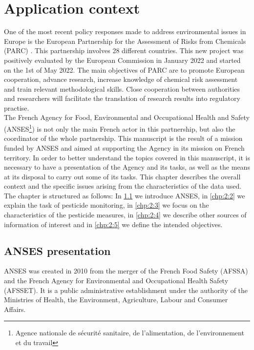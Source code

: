 \chapter{Application context}\label{chp:2}

\minitoc

\clearpage

One of the most recent policy responses made to address environmental issues in Europe is the European Partnership for the Assessment of Risks from Chemicals (PARC) \citep{PARC}. This partnership involves 28 different countries. This new project was positively evaluated by the European Commission in January 2022 and started on the 1st of May 2022. The main objectives of PARC are to promote European cooperation, advance research, increase knowledge of chemical risk assessment and train relevant methodological skills. Close cooperation between authorities and researchers will facilitate the translation of research results into regulatory practise. \\
The French Agency for Food, Environmental and Occupational Health and Safety (ANSES\footnote{Agence nationale de sécurité sanitaire, de l'alimentation, de l'environnement et du travail}) is not only the main French actor in this partnership, but also the coordinator of the whole partnership. This manuscript is the result of a mission funded by ANSES and aimed at supporting the Agency in its mission on French territory. In order to better understand the topics covered in this manuscript, it is necessary to have a presentation of the Agency and its tasks, as well as the means at its disposal to carry out some of its tasks. This chapter describes the overall context and the specific issues arising from the characteristics of the data used. The chapter is structured as follows: In \ref{chp:2:1} we introduce ANSES, in \ref{chp:2:2} we explain the task of pesticide monitoring, in \ref{chp:2:3} we focus on the characteristics of the pesticide measures, in \ref{chp:2:4} we describe other sources of information of interest and in \ref{chp:2:5} we define the intended objectives.

\section{ANSES presentation}\label{chp:2:1}

ANSES was created in 2010 from the merger of the French Food Safety (AFSSA) and the French Agency for Environmental and Occupational Health Safety (AFSSET). It is a public administrative establishment under the authority of the Ministries of Health, the Environment, Agriculture, Labour and Consumer Affairs.

